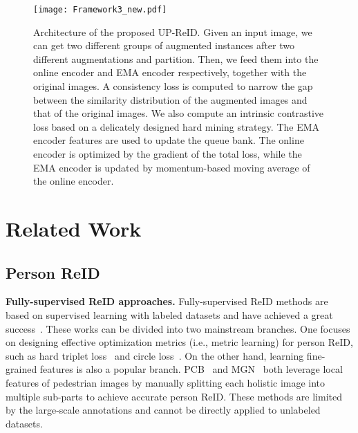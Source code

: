 \documentclass[10pt,twocolumn,letterpaper]{article}
\begin{document}
\begin{figure*}[t!]
\centering
\centering
\texttt{[image: Framework3\_new.pdf]}
\caption{Architecture of the proposed UP-ReID. Given an input image, we can get two different groups of augmented instances after two different augmentations and partition. Then, we feed them into the online encoder and EMA encoder respectively, together with the original images. A consistency loss is computed to narrow the gap between the similarity distribution of the augmented images and that of the original images. We also compute an intrinsic contrastive loss based on a delicately designed hard mining strategy. The EMA encoder features are used to update the queue bank. The online encoder is optimized by the gradient of the total loss, while the EMA encoder is updated by momentum-based moving average of the online encoder.}
\label{fig:Framework}
\vspace{-2mm}
\end{figure*}



\section{Related Work}

\subsection{Person ReID}

\noindent\textbf{Fully-supervised ReID approaches.} Fully-supervised ReID methods are based on supervised learning with labeled datasets and have achieved a great success~\cite{li2014deepreid,shen2018person,zhang2019densely,jin2020semantics}. These works can be divided into two mainstream branches. One focuses on designing effective optimization metrics (i.e., metric learning) for person ReID, such as hard triplet loss~\cite{hermans2017defense} and circle loss~\cite{sun2020circle}. On the other hand, learning fine-grained features is also a popular branch. PCB~\cite{sun2018beyond} and MGN~\cite{wang2018learning} both leverage local features of pedestrian images by manually splitting each holistic image into multiple sub-parts to achieve accurate person ReID. These methods are limited by the large-scale annotations and cannot be directly applied to unlabeled datasets.
\end{document}

